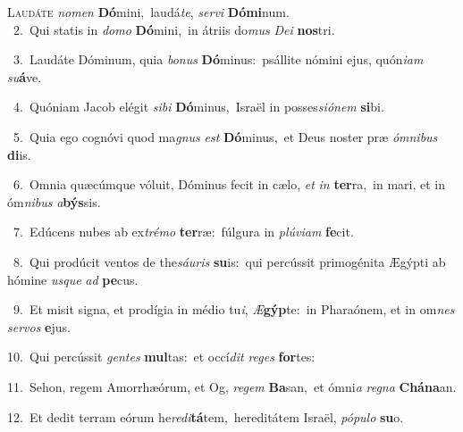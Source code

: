 \lettrine{\initial\textcolor{\initialcolor}{L}}{audáte} \textit{no}\-\textit{men} \textbf{Dó}\-mini,~\star laudá\-\textit{te}\-, \textit{ser}\-\textit{vi} \textbf{Dó}\-\textbf{mi}num.\\
{\numbfont\textcolor{\numbcolor}{~2.}}~Qui statis in \textit{do}\-\textit{mo} \textbf{Dó}\-mini,~\star in átriis do\textit{mus} \textit{De}\-\textit{i} \textbf{nos}\-tri.\par
{\numbfont\textcolor{\numbcolor}{~3.}}~Laudáte Dóminum, quia \textit{bo}\-\textit{nus} \textbf{Dó}\-minus:~\star psállite nómini ejus, quón\-\textit{i}\-\textit{am} \textit{su}\-\textbf{á}ve.\par
{\numbfont\textcolor{\numbcolor}{~4.}}~Quóniam Jacob elégit \textit{si}\-\textit{bi} \textbf{Dó}\-minus,~\star Israël in posses\-\textit{si}\-\textit{ó}\textit{nem} \textbf{si}\-bi.\par
{\numbfont\textcolor{\numbcolor}{~5.}}~Quia ego cognóvi quod ma\textit{gnus} \textit{est} \textbf{Dó}\-minus,~\star et Deus noster præ \textit{óm}\-\textit{ni}\textit{bus} \textbf{di}\-is.\par
{\numbfont\textcolor{\numbcolor}{~6.}}~Omnia quæcúmque vóluit, Dóminus fecit in cælo, \textit{et} \textit{in} \textbf{ter}\-ra,~\star in mari, et in óm\-\textit{ni}\-\textit{bus} \textit{a}\-\textbf{býs}sis.\par
{\numbfont\textcolor{\numbcolor}{~7.}}~Edúcens nubes ab ex\-\textit{tré}\-\textit{mo} \textbf{ter}\-ræ:~\star fúlgura in \textit{plú}\-\textit{vi}\textit{am} \textbf{fe}\-cit.\par
{\numbfont\textcolor{\numbcolor}{~8.}}~Qui prodúcit ventos de the\-\textit{sáu}\-\textit{ris} \textbf{su}\-is:~\star qui percússit primogénita Ægýpti ab hómine \textit{us}\-\textit{que} \textit{ad} \textbf{pe}\-cus.\par
{\numbfont\textcolor{\numbcolor}{~9.}}~Et misit signa, et prodígia in médio tu\-\textit{i}\-, \textit{Æ}\-\textbf{gýp}te:~\star in Pharaónem, et in om\textit{nes} \textit{ser}\-\textit{vos} \textbf{e}\-jus.\par
{\numbfont\textcolor{\numbcolor}{10.}}~Qui percússit \textit{gen}\-\textit{tes} \textbf{mul}\-tas:~\star et occí\textit{dit} \textit{re}\-\textit{ges} \textbf{for}\-tes:\par
{\numbfont\textcolor{\numbcolor}{11.}}~Sehon, regem Amorrhæórum, et Og, \textit{re}\-\textit{gem} \textbf{Ba}\-san,~\star et ómni\textit{a} \textit{re}\-\textit{gna} \textbf{Chá}\-\textbf{na}an.\par
{\numbfont\textcolor{\numbcolor}{12.}}~Et dedit terram eórum he\-\textit{re}\-\textit{di}\textbf{tá}tem,~\star hereditátem Israël, \textit{pó}\-\textit{pu}\textit{lo} \textbf{su}\-o.\par
